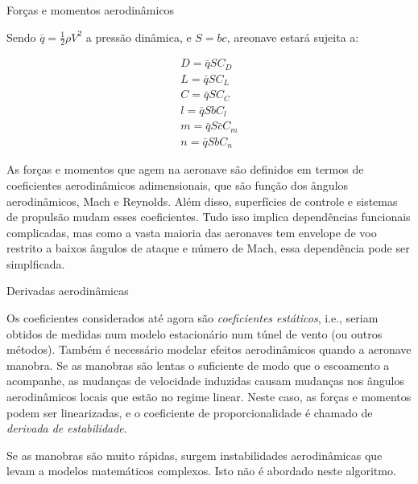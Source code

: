\documentclass{beamer}
\newcommand{\jindent}{\justifying\setlength{\parindent}{1.5em}}
\begin{document}

\begin{frame}{Forças e momentos aerodinâmicos}

    \jindent
    Sendo $\bar q = \frac{1}{2} \rho V^2$ a pressão dinâmica, e $S = bc$, areonave estará sujeita a:

    \begin{gather*}
        D = \bar q S C_D \\
        L = \bar q S C_L \\
        C = \bar q S C_C \\
        l = \bar q S b C_l \\
        m = \bar q S \bar c C_m \\
        n = \bar q S b C_n
    \end{gather*}

    \jindent
    As forças e momentos que agem na aeronave são definidos em termos de coeficientes aerodinâmicos adimensionais, que são função dos ângulos aerodinâmicos, Mach e Reynolds. Além disso, superfícies de controle e sistemas de propulsão mudam esses coeficientes. Tudo isso implica dependências funcionais complicadas, mas como a vasta maioria das aeronaves tem envelope de voo restrito a baixos ângulos de ataque e número de Mach, essa dependência pode ser simplficada.
    
\end{frame}


\begin{frame}{Derivadas aerodinâmicas}

    \jindent
    Os coeficientes considerados até agora são \textit{coeficientes estáticos}, i.e., seriam obtidos de medidas num modelo estacionário num túnel de vento (ou outros métodos). Também é necessário modelar efeitos aerodinâmicos quando a aeronave manobra. Se as manobras são lentas o suficiente de modo que o escoamento a acompanhe, as mudanças de velocidade induzidas causam mudanças nos ângulos aerodinâmicos locais que estão no regime linear. Neste caso, as forças e momentos podem ser linearizadas, e o coeficiente de proporcionalidade é chamado de \textit{derivada de estabilidade}.

    \jindent
    Se as manobras são muito rápidas, surgem instabilidades aerodinâmicas que levam a modelos matemáticos complexos. Isto não é abordado neste algoritmo.
    
\end{frame}
\end{document}
